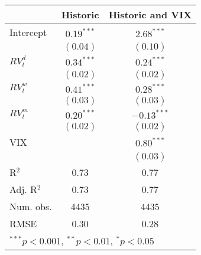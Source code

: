 
\begin{tabular}{l c c }
\hline
 & Historic & Historic and VIX \\
\hline
Intercept    & $0.19^{***}$ & $2.68^{***}$  \\
             & $(0.04)$     & $(0.10)$      \\
$RV_{t}^{d}$ & $0.34^{***}$ & $0.24^{***}$  \\
             & $(0.02)$     & $(0.02)$      \\
$RV_{t}^{w}$ & $0.41^{***}$ & $0.28^{***}$  \\
             & $(0.03)$     & $(0.03)$      \\
$RV_{t}^{m}$ & $0.20^{***}$ & $-0.13^{***}$ \\
             & $(0.02)$     & $(0.02)$      \\
VIX          &              & $0.80^{***}$  \\
             &              & $(0.03)$      \\
\hline
R$^2$        & 0.73         & 0.77          \\
Adj. R$^2$   & 0.73         & 0.77          \\
Num. obs.    & 4435         & 4435          \\
RMSE         & 0.30         & 0.28          \\
\hline
\multicolumn{3}{l}{\scriptsize{$^{***}p<0.001$, $^{**}p<0.01$, $^*p<0.05$}}
\end{tabular}
